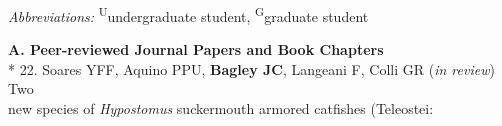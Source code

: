 \documentclass[margin,line]{res}
\begin{document}
\begin{resume}

\emph{Abbreviations:} \textsuperscript{U}undergraduate student, \textsuperscript{G}graduate student

\textbf{A. Peer-reviewed Journal Papers and Book Chapters}\vspace{2mm}\\*
%
%
22. Soares YFF, Aquino PPU, \textbf{Bagley JC}, Langeani F, Colli GR (\emph{in review}) Two\\
\hspace*{8mm} new species of \emph{Hypostomus} suckermouth armored catfishes (Teleostei:\\
\vspace{2mm}

\end{resume}
\end{document}
